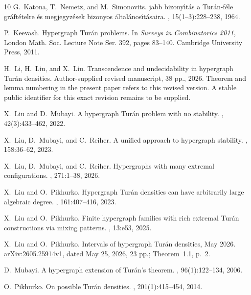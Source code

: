 \documentclass[10pt]{article}
\numberwithin{equation}{section}
\theoremstyle{definition}
\begin{document}
\begin{thebibliography}{10}
G.~Katona, T.~Nemetz, and M.~Simonovits.
jabb bizony{\'\i}t{\'a}s a {T}ur{\'a}n-f{\'e}le
  gr{\'a}ft{\'e}telre {\'e}s megjegyz{\'e}sek bizonyos
  {\'a}ltal{\'a}nos{\'\i}t{\'a}saira.
, 15(1--3):228--238, 1964.

P.~Keevash.
\newblock Hypergraph {T}ur{\'a}n problems.
\newblock In {\em Surveys in Combinatorics 2011}, London Math. Soc. Lecture
  Note Ser. 392, pages 83--140. Cambridge University Press, 2011.

H.~Li, H.~Liu, and X.~Liu.
\newblock Transcendence and undecidability in hypergraph {T}ur{\'a}n densities.
\newblock Author-supplied revised manuscript, 38 pp., 2026.
\newblock Theorem and lemma numbering in the present paper refers to this
  revised version. A stable public identifier for this exact revision
  remains to be supplied.

X.~Liu and D.~Mubayi.
\newblock A hypergraph {T}ur{\'a}n problem with no stability.
, 42(3):433--462, 2022.

X.~Liu, D.~Mubayi, and C.~Reiher.
\newblock A unified approach to hypergraph stability.
, 158:36--62, 2023.

X.~Liu, D.~Mubayi, and C.~Reiher.
\newblock Hypergraphs with many extremal configurations.
, 271:1--38, 2026.

X.~Liu and O.~Pikhurko.
\newblock Hypergraph {T}ur{\'a}n densities can have arbitrarily large algebraic
  degree.
, 161:407--416, 2023.

X.~Liu and O.~Pikhurko.
\newblock Finite hypergraph families with rich extremal {Tur\'an} constructions
  via mixing patterns.
, 13:e53, 2025.

X.~Liu and O.~Pikhurko.
\newblock Intervals of hypergraph {T}ur{\'a}n densities, May 2026.
\newblock \href{https://arxiv.org/abs/2605.25914v1}{arXiv:2605.25914v1},
  dated May 25, 2026, 23 pp.; Theorem~1.1, p.~2.

D.~Mubayi.
\newblock A hypergraph extension of {T}ur{\'a}n's theorem.
, 96(1):122--134, 2006.

O.~Pikhurko.
\newblock On possible {T}ur{\'a}n densities.
, 201(1):415--454, 2014.


\end{thebibliography}
\end{document}
